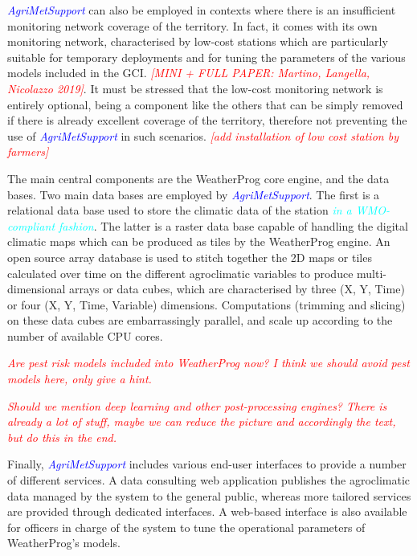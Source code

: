 \documentclass[authoryear,preprint,review,12pt]{elsarticle}
\newcommand{\note}[1]{\emph{\textcolor{red}{#1}}}
\newcommand{\update}[1]{\emph{\textcolor{blue}{#1}}}
\newcommand{\review}[1]{\emph{\textcolor{cyan}{#1}}}
\newcommand{\gci}{\update{AgriMetSupport}\xspace}
\begin{document}
\gci can also be employed in contexts where there is an insufficient monitoring network coverage of the territory.
In fact, it comes with its own monitoring network, characterised by low-cost stations which are particularly suitable for temporary deployments and for tuning the parameters of the various models included in the GCI.  \note{[MINI + FULL PAPER: Martino, Langella, Nicolazzo 2019]}.
It must be stressed that the low-cost monitoring network is entirely optional, being a component like the others that can be simply removed if there is already excellent coverage of the territory, therefore not preventing the use of \gci in such scenarios. \note{[add installation of low cost station by farmers]}

The main central components are the WeatherProg core engine, and the data bases. Two main data bases are employed by \gci.
The first is a relational data base used to store the climatic data of the station  \review{in a WMO-compliant fashion}.
The latter  is a raster data base capable of handling the digital climatic maps which can be produced as tiles by the WeatherProg engine.
An open source array database is used to stitch together the 2D maps or tiles calculated over time on the different agroclimatic variables to produce multi-dimensional arrays or data cubes, which are  characterised by three (X, Y, Time) or four (X, Y, Time, Variable) dimensions.
Computations (trimming and slicing) on these data cubes are embarrassingly parallel, and scale up according to the number of available CPU cores.

\note{Are pest risk models included into WeatherProg now? I think we should avoid pest models here, only give a hint.}

\note{Should we mention deep learning and other post-processing engines? There is already a lot of stuff, maybe we can reduce the picture and accordingly the text, but do this in the end.}

Finally, \gci includes various end-user interfaces to provide a number of different services. A data consulting web application publishes the agroclimatic data managed by the system to the general public, whereas more tailored services are provided through dedicated interfaces. A web-based interface is also available for officers in charge of the system to tune the operational parameters of WeatherProg's models.
\end{document}

